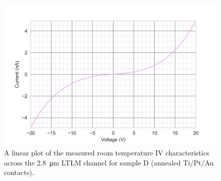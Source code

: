 \begin{refsection}
\begin{figure}[H]
    \centering
    \includegraphics[width=0.8\linewidth]{Chapter7/Figs/Raster/20V IV characteristics at 21 C.png}
    \caption{A linear plot of the measured room temperature IV characteristics across the 2.8~\si{\micro\metre} LTLM channel for sample D (annealed Ti/Pt/Au contacts).}
    \label{fig:d_20v_linear}
\end{figure}


\end{refsection}
